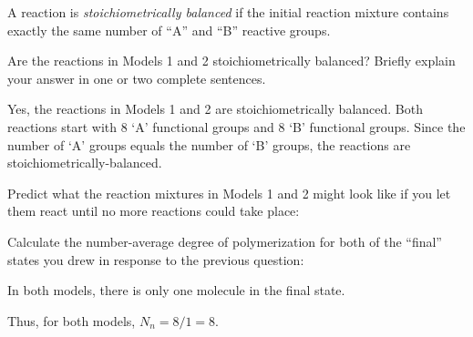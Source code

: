 \begin{activity}
\begin{ctqs}
\end{ctqs}
	
\begin{infobox}

A reaction is \emph{stoichiometrically balanced} if the initial reaction mixture contains exactly the same number of ``A'' and ``B'' reactive groups.

\end{infobox}
	
\begin{ctqs}
		\question Are the reactions in Models 1 and 2 stoichiometrically balanced?  Briefly explain your answer in one or two complete sentences.
		
		\begin{solution}[1in]
			Yes, the reactions in Models 1 and 2 are stoichiometrically balanced.  Both reactions start with 8 `A' functional groups and 8 `B' functional groups.  Since the number of `A' groups equals the number of `B' groups, the reactions are stoichiometrically-balanced.
		\end{solution}
		
		\question Predict what the reaction mixtures in Models 1 and 2 might look like if you let them react until no more reactions could take place:
		
	\begin{solution}[2in]
	
	\end{solution}
		
		\question Calculate the number-average degree of polymerization for both of the ``final'' states you drew in response to the previous question:
		
		\begin{solution}[1in]
			In both models, there is only one molecule in the final state.
			
			Thus, for both models, $N_n = 8/1 = 8$.
		\end{solution}
\end{ctqs}


\end{activity}
